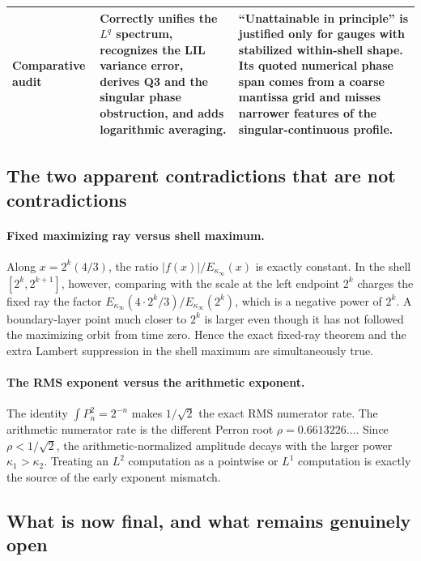 \documentclass[11pt,oneside]{article}
\theoremstyle{definition}
\theoremstyle{remark}
\begin{document}
\begin{center}
\begin{tabularx}{\textwidth}{@{}>{\raggedright\arraybackslash}p{}
 >{\raggedright\arraybackslash}p{}>{\raggedright\arraybackslash}X@{}}
Comparative audit~\cite{comparative}
& Correctly unifies the $L^q$ spectrum, recognizes the LIL variance error,
derives Q3 and the singular phase obstruction, and adds logarithmic averaging.
& ``Unattainable in principle'' is justified only for gauges with stabilized
within-shell shape.  Its quoted numerical phase span comes from a coarse
mantissa grid and misses narrower features of the singular-continuous profile.\\
\bottomrule
\end{tabularx}
\end{center}

\subsection{The two apparent contradictions that are not contradictions}

\paragraph{Fixed maximizing ray versus shell maximum.}
Along $x=2^k(4/3)$, the ratio $|f(x)|/E_{\kappa_\infty}(x)$ is exactly
constant.  In the shell $[2^k,2^{k+1}]$, however, comparing with the scale at
the left endpoint $2^k$ charges the fixed ray the factor
$E_{\kappa_\infty}(4\cdot2^k/3)/E_{\kappa_\infty}(2^k)$, which is a negative
power of $2^k$.  A boundary-layer point much closer to $2^k$ is larger even
though it has not followed the maximizing orbit from time zero.  Hence the
exact fixed-ray theorem and the extra Lambert suppression in the shell maximum
are simultaneously true.

\paragraph{The RMS exponent versus the arithmetic exponent.}
The identity $\int P_n^2=2^{-n}$ makes $1/\sqrt2$ the exact RMS numerator rate.
The arithmetic numerator rate is the different Perron root
$\rho=0.6613226\ldots$.  Since $\rho<1/\sqrt2$, the arithmetic-normalized
amplitude decays with the larger power $\kappa_1>\kappa_2$.  Treating an
$L^2$ computation as a pointwise or $L^1$ computation is exactly the source of
the early exponent mismatch.

\subsection{What is now final, and what remains genuinely open}
\end{document}
